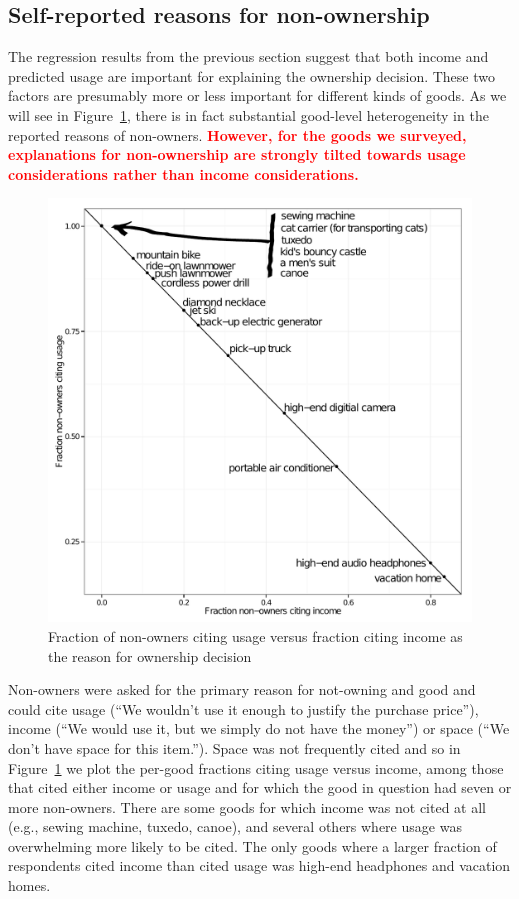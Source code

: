 \documentclass[11pt]{article}
\newcommand{\important}[1]{\textcolor{red}{\textbf{#1}}}
\newcommand{\important}[1]{#1}
\begin{document}
\subsection{Self-reported reasons for non-ownership}
The regression results from the previous section suggest that both income and predicted usage are important for explaining the ownership decision. 
These two factors are presumably more or less important for different kinds of goods.
As we will see in Figure~\ref{fig:reasons}, there is in fact substantial good-level heterogeneity in the reported reasons of non-owners.
\important{However, for the goods we surveyed, explanations for non-ownership are strongly tilted towards usage considerations rather than income considerations.}

\begin{figure}
\centering 
\caption{Fraction of non-owners citing usage versus fraction citing income as the reason for ownership decision} 
\label{fig:reasons}
\begin{minipage}{0.60 \linewidth}
\includegraphics[width = \linewidth]{./plots/reasons_for_nonownership.pdf} 
\end{minipage} 
\end{figure} 

Non-owners were asked for the primary reason for not-owning and good and could cite usage (``We wouldn't use it enough to justify the purchase price''), income  (``We would use it, but we simply do not have the money'') or space (``We don't have space for this item.'').
Space was not frequently cited and so in Figure~\ref{fig:reasons} we plot the per-good fractions citing usage versus income, among those that cited either income or usage and for which the good in question had seven or more non-owners. 
There are some goods for which income was not cited at all (e.g., sewing machine, tuxedo, canoe), and several others where usage was overwhelming more likely to be cited.
The only goods where a larger fraction of respondents cited income than cited usage was high-end headphones and vacation homes. 
\end{document}
